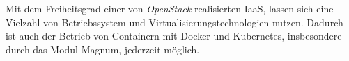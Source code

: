 \documentclass[../main.tex]{subfiles}
\begin{document}
    Mit dem Freiheitsgrad einer von \emph{OpenStack} realisierten IaaS, lassen sich eine Vielzahl von Betriebssystem und Virtualisierungstechnologien nutzen. Dadurch ist auch der Betrieb von Containern mit Docker und Kubernetes, insbesondere durch das Modul Magnum, jederzeit möglich.










\end{document}
